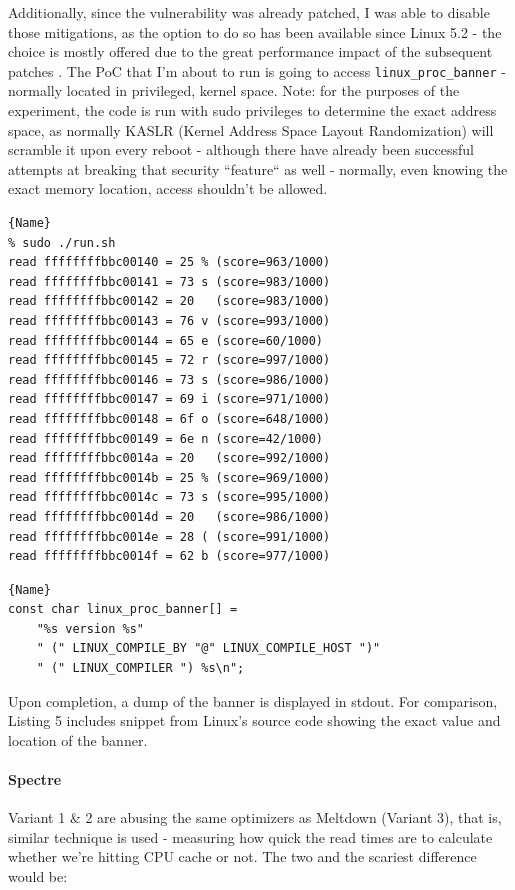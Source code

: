 \documentclass{article}
\begin{document}
Additionally, since the vulnerability was already patched, I was able to disable those mitigations, as the option to do so has been available since Linux 5.2 - the choice is mostly offered due to the great performance impact of the subsequent patches \cite{low2018overview}. The PoC that I'm about to run is going to access \lstinline{linux_proc_banner} - normally located in privileged, kernel space. Note: for the purposes of the experiment, the code is run with sudo privileges to determine the exact address space, as normally KASLR (Kernel Address Space Layout Randomization) will scramble it upon every reboot - although there have already been successful attempts at breaking that security ``feature`` as well \cite{jang2016breaking} - normally, even knowing the exact memory location, access shouldn't be allowed. 

\pagebreak

\begin{lstlisting}[caption=Meltdown in action, frame=tlrb, breaklines=true]{Name}
% sudo ./run.sh          
read ffffffffbbc00140 = 25 % (score=963/1000)
read ffffffffbbc00141 = 73 s (score=983/1000)
read ffffffffbbc00142 = 20   (score=983/1000)
read ffffffffbbc00143 = 76 v (score=993/1000)
read ffffffffbbc00144 = 65 e (score=60/1000)
read ffffffffbbc00145 = 72 r (score=997/1000)
read ffffffffbbc00146 = 73 s (score=986/1000)
read ffffffffbbc00147 = 69 i (score=971/1000)
read ffffffffbbc00148 = 6f o (score=648/1000)
read ffffffffbbc00149 = 6e n (score=42/1000)
read ffffffffbbc0014a = 20   (score=992/1000)
read ffffffffbbc0014b = 25 % (score=969/1000)
read ffffffffbbc0014c = 73 s (score=995/1000)
read ffffffffbbc0014d = 20   (score=986/1000)
read ffffffffbbc0014e = 28 ( (score=991/1000)
read ffffffffbbc0014f = 62 b (score=977/1000)
\end{lstlisting}


\begin{lstlisting}[caption=init/version.c from Linux kernel source code, frame=tlrb, breaklines=true]{Name}
const char linux_proc_banner[] =
	"%s version %s"
	" (" LINUX_COMPILE_BY "@" LINUX_COMPILE_HOST ")"
	" (" LINUX_COMPILER ") %s\n";
\end{lstlisting}

Upon completion, a dump of the banner is displayed in stdout. For comparison, Listing 5 includes snippet from Linux's source code \cite{linuxsrc} showing the exact value and location of the banner. 

\paragraph{Spectre}
Variant 1 \& 2 are abusing the same optimizers as Meltdown (Variant 3), that is, similar technique is used - measuring how quick the read times are to calculate whether we're hitting CPU cache or not. The two and the scariest difference would be:
\end{document}
